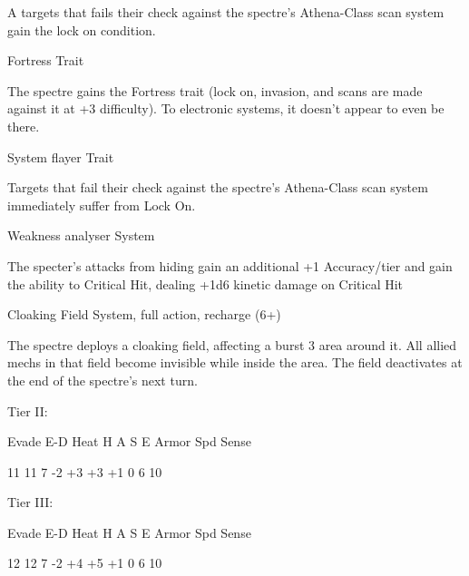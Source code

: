 A targets that fails their check against the spectre’s Athena-Class scan system gain the lock on
condition.


Fortress
Trait

The spectre gains the Fortress trait (lock on, invasion, and scans are made against it at +3
difficulty). To electronic systems, it doesn’t appear to even be there.


System flayer
Trait

Targets that fail their check against the spectre’s Athena-Class scan system immediately suffer
from Lock On.


Weakness analyser
System

The specter’s attacks from hiding gain an additional +1 Accuracy/tier and gain the ability to
Critical Hit, dealing +1d6 kinetic damage on Critical Hit


Cloaking Field
System, full action, recharge (6+)

The spectre deploys a cloaking field, affecting a burst 3 area around it. All allied mechs in that
field become invisible while inside the area. The field deactivates at the end of the spectre’s next
turn.


Tier II:


          Evade     E-D     Heat    H     A     S     E        Armor        Spd       Sense

          11        11      7       -2    +3    +3    +1       0            6         10

Tier III:


          Evade     E-D     Heat    H     A     S     E        Armor        Spd       Sense

          12        12      7       -2    +4    +5    +1       0            6         10
